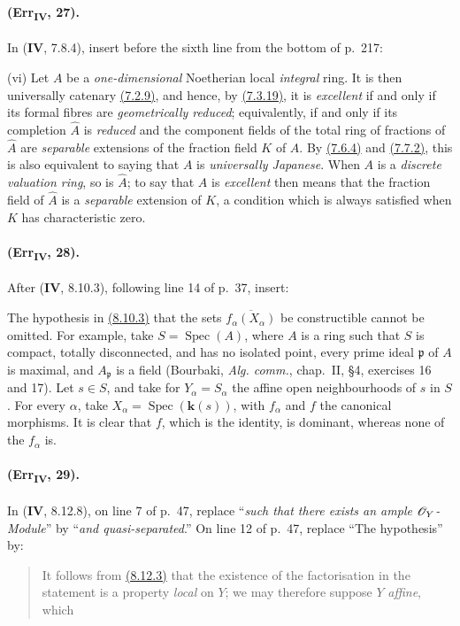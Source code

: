 \paragraph{(Err\textsubscript{\textmd{IV}}, 27).}
In (\textbf{IV}, 7.8.4), insert before the sixth line from the bottom of p.~217:

\smallskip
\noindent
\textup{(vi)} Let $A$ be a \emph{one-dimensional} Noetherian local \emph{integral}
ring.  It is then universally catenary {\hyperref[IV.7.2.9]{(7.2.9)}}, and hence, by {\hyperref[IV.7.3.19]{(7.3.19)}},
it is \emph{excellent} if and only if its formal fibres are \emph{geometrically
reduced}; equivalently, if and only if its completion $\widehat A$ is
\emph{reduced} and the component fields of the total ring of fractions of
$\widehat A$ are \emph{separable} extensions of the fraction field $K$ of
$A$.  By {\hyperref[IV.7.6.4]{(7.6.4)}} and {\hyperref[IV.7.7.2]{(7.7.2)}}, this is also equivalent to saying that
$A$ is \emph{universally Japanese}.  When $A$ is a \emph{discrete valuation ring},
so is $\widehat A$; to say that $A$ is \emph{excellent} then means that the
fraction field of $\widehat A$ is a \emph{separable} extension of $K$, a
condition which is always satisfied when $K$ has characteristic zero.

\paragraph{(Err\textsubscript{\textmd{IV}}, 28).}
After (\textbf{IV}, 8.10.3), following line 14 of p.~37, insert:

\begin{remark}[8.10.3.1]
\label{IV.8.10.3.1}
The hypothesis in {\hyperref[IV.8.10.3]{(8.10.3)}} that the sets
$\overline{f_\alpha(X_\alpha)}$ be constructible cannot be omitted.
For example, take $S=\operatorname{Spec}(A)$, where $A$ is a ring such
that $S$ is compact, totally disconnected, and has no isolated point,
every prime ideal $\mathfrak p$ of $A$ is maximal, and $A_\mathfrak p$
is a field (Bourbaki, \emph{Alg. comm.}, chap.~II, \S4,
exercises 16 and 17).  Let $s\in S$, and take for
$Y_\alpha=S_\alpha$ the affine open neighbourhoods of $s$ in $S$.
For every $\alpha$, take $X_\alpha=\operatorname{Spec}(\boldsymbol{k}(s))$, with
$f_\alpha$ and $f$ the canonical morphisms.  It is clear that $f$,
which is the identity, is dominant, whereas none of the $f_\alpha$ is.
\end{remark}

\paragraph{(Err\textsubscript{\textmd{IV}}, 29).}
In (\textbf{IV}, 8.12.8), on line 7 of p.~47, replace ``\emph{such that there exists an
ample $\mathscr{O}_Y$-Module}'' by ``\emph{and quasi-separated}.''  On line 12 of
p.~47, replace ``The hypothesis'' by:
\begin{quote}
It follows from {\hyperref[IV.8.12.3]{(8.12.3)}} that the existence of the factorisation in the
statement is a property \emph{local} on $Y$; we may therefore suppose $Y$
\emph{affine}, which
\end{quote}


